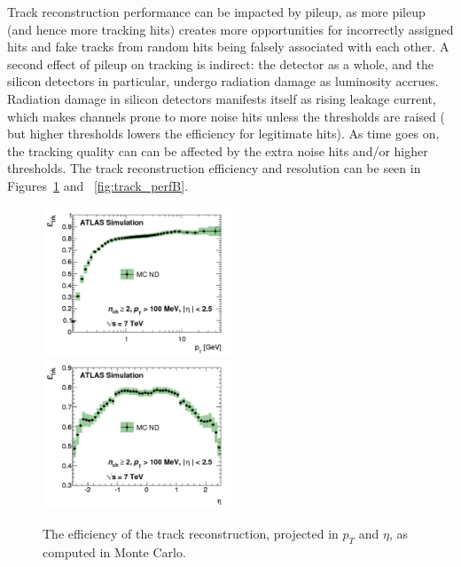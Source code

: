 Track reconstruction performance can be impacted by pileup, as more pileup (and hence more tracking hits) creates 
more opportunities for incorrectly assigned hits and fake tracks from random hits being falsely associated with each other.  A 
second effect of pileup on tracking is indirect: the detector as a whole, and the silicon detectors in 
particular, undergo radiation damage as luminosity accrues.  Radiation damage in silicon detectors manifests 
itself as rising leakage current, which makes channels prone to more noise hits unless the thresholds are raised (
but higher thresholds lowers the efficiency for legitimate hits).  As time goes on, the tracking quality can can 
be affected by the extra noise hits and/or higher thresholds.  The track reconstruction efficiency and resolution
can be seen in Figures~\ref{fig:track_perfA} and ~\ref{fig:track_perfB}.

\begin{figure}
	\includegraphics[width=0.5\textwidth]{ReconstructionPerformance/images/track_perf1.pdf}
	\includegraphics[width=0.5\textwidth]{ReconstructionPerformance/images/track_perf2.pdf}
	\label{fig:track_perfA}  
	\caption{The efficiency of the track reconstruction, projected in $p_T$ and $\eta$, as computed in Monte Carlo.}
\end{figure}



